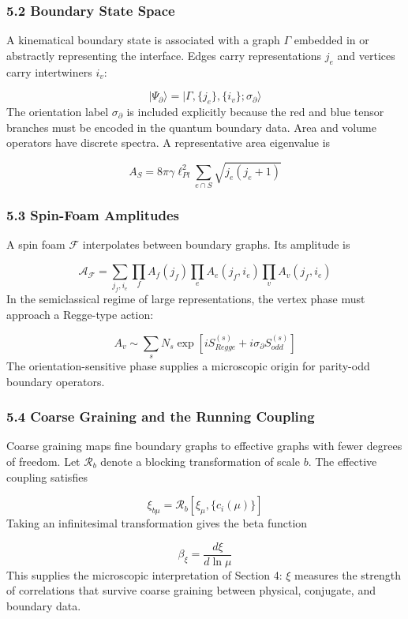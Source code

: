 \documentclass[aps,prd,onecolumn,superscriptaddress,nofootinbib,longbibliography,10pt]{revtex4-2}
\begin{document}
  
\subsubsection*{5.2 Boundary State Space}

  A kinematical boundary state is associated with a graph \(\Gamma\) embedded in or abstractly representing the interface. Edges carry representations \(j_e\) and vertices carry intertwiners \(i_v\):


  \[ |\Psi_\partial\rangle = |\Gamma, \{j_e\}, \{i_v\}; \sigma_\partial\rangle \]
  The orientation label \(\sigma_\partial\) is included explicitly because the red and blue tensor branches must be encoded in the quantum boundary data. Area and volume operators have discrete spectra. A representative area eigenvalue is


  \[ A_S = 8\pi\gamma \ell_{Pl}^2 \sum_{e\cap S} \sqrt{j_e(j_e + 1)} \]

  
\subsubsection*{5.3 Spin-Foam Amplitudes}

  A spin foam \(\mathcal{F}\) interpolates between boundary graphs. Its amplitude is


  \[ \mathcal{A}_{\mathcal{F}} = \sum_{j_f, i_e} \prod_f A_f(j_f) \prod_e A_e(j_f, i_e) \prod_v A_v(j_f, i_e) \]
  In the semiclassical regime of large representations, the vertex phase must approach a Regge-type action:


  \[ A_v \sim \sum_s N_s \exp\left[ i S_{Regge}^{(s)} + i\sigma_\partial S_{odd}^{(s)} \right] \]
  The orientation-sensitive phase supplies a microscopic origin for parity-odd boundary operators.



  
\subsubsection*{5.4 Coarse Graining and the Running Coupling}

  Coarse graining maps fine boundary graphs to effective graphs with fewer degrees of freedom. Let \(\mathcal{R}_b\) denote a blocking transformation of scale \(b\). The effective coupling satisfies


  \[ \xi_{b\mu} = \mathcal{R}_b[\xi_\mu, \{c_i(\mu)\}] \]
  Taking an infinitesimal transformation gives the beta function


  \[ \beta_\xi = \frac{d\xi}{d\ln\mu} \]
  This supplies the microscopic interpretation of Section 4: \(\xi\) measures the strength of correlations that survive coarse graining between physical, conjugate, and boundary data.
\end{document}
